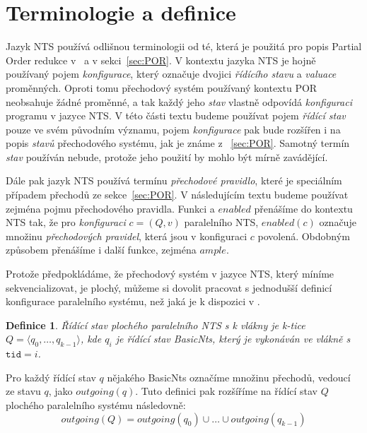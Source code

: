 \documentclass[12pt]{fithesis2}
\newtheorem{definition}{Definice}
\newcommand{\tuple}[1]{\langle #1 \rangle}
\begin{document}
\section{Terminologie a definice}
Jazyk NTS používá odlišnou terminologii od té, která je použitá pro popis Partial Order redukce v~\cite{CLARKE} a v sekci~\ref{sec:POR}. V kontextu jazyka NTS je hojně používaný pojem \textit{konfigurace}, který označuje dvojici \textit{řídícího stavu} a \textit{valuace} proměnných. Oproti tomu přechodový systém používaný kontextu POR neobsahuje žádné proměnné, a tak každý jeho \textit{stav} vlastně odpovídá \textit{konfiguraci} programu v jazyce NTS. V této části textu budeme používat pojem \textit{řídící stav} pouze ve svém původním významu, pojem \textit{konfigurace} pak bude rozšířen i na popis \textit{stavů} přechodového systému, jak je známe z ~\ref{sec:POR}. Samotný termín \textit{stav} používán nebude, protože jeho použití by mohlo být mírně zavádějící.

Dále pak jazyk NTS používá termínu \textit{přechodové pravidlo}, které je speciálním případem přechodů ze sekce~\ref{sec:POR}. V následujícím textu budeme používat zejména pojmu přechodového pravidla. Funkci a $\mathit{enabled}$ přenášíme do kontextu NTS tak, že pro \textit{konfiguraci} $c=(Q, v)$ paralelního NTS, $\mathit{enabled}(c)$ označuje množinu \textit{přechodových pravidel}, která jsou v konfiguraci $c$ povolená. Obdobným způsobem přenášíme i další funkce, zejména $\mathit{ample}$.

Protože předpokládáme, že přechodový systém v jazyce NTS, který míníme sekvencializovat, je plochý, můžeme si dovolit pracovat s jednodušší definicí konfigurace paralelního systému, než jaká je k dispozici v \cite{NTSref}.
\begin{definition}
Řídící stav plochého paralelního NTS s k vlákny je k-tice $Q = \tuple{q_0, \ldots, q_{k-1}}$, kde $q_i$ je řídící stav BasicNts, který je vykonáván ve vlákně s $\texttt{tid} = i$.
\end{definition}

Pro každý řídící stav $q$ nějakého BasicNts označíme množinu přechodů, vedoucí ze stavu $q$, jako $\mathit{outgoing}(q)$. Tuto definici pak rozšíříme na řídící stav $Q$ plochého paralelního systému následovně:
\begin{equation}
\mathit{outgoing}(Q) = \mathit{outgoing}(q_0) \cup \ldots \cup \mathit{outgoing}(q_{k-1})
\end{equation}
\end{document}
